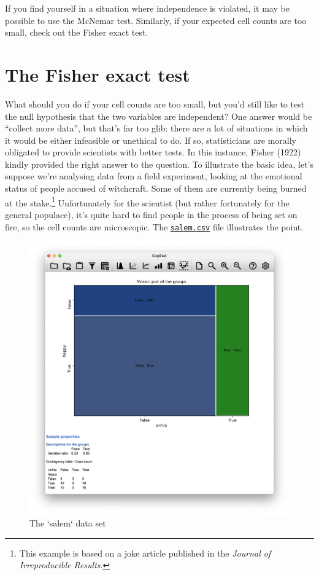\documentclass[
]{book}
\theoremstyle{definition}
\theoremstyle{definition}
\theoremstyle{definition}
\theoremstyle{definition}
\theoremstyle{remark}
\begin{document}
If you find yourself in a situation where independence is violated, it may be possible to use the McNemar test. Similarly, if your expected cell counts are too small, check out the Fisher exact test.

\hypertarget{fisherexacttest}{%
\section{The Fisher exact test}\label{fisherexacttest}}

What should you do if your cell counts are too small, but you'd still like to test the null hypothesis that the two variables are independent? One answer would be ``collect more data'', but that's far too glib: there are a lot of situations in which it would be either infeasible or unethical to do. If so, statisticians are morally obligated to provide scientists with better tests. In this instance, Fisher (1922) kindly provided the right answer to the question. To illustrate the basic idea, let's suppose we're analysing data from a field experiment, looking at the emotional status of people accused of witchcraft. Some of them are currently being burned at the stake.\footnote{This example is based on a joke article published in the \emph{Journal of Irreproducible Results}.} Unfortunately for the scientist (but rather fortunately for the general populace), it's quite hard to find people in the process of being set on fire, so the cell counts are microscopic. The \href{resources/data/salem.csv}{\texttt{salem.csv}} file illustrates the point.

\begin{figure}

{\centering \includegraphics[width=0.66\linewidth]{resources/image/cogstatsalemload} 

}

\caption{The `salem` data set}\label{fig:cogstatsalemload}
\end{figure}
\end{document}
